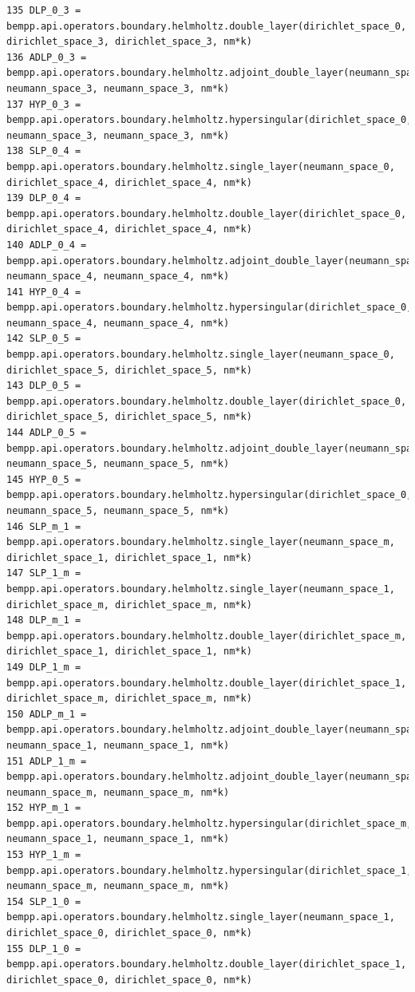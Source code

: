 \documentclass[12pt,letterpaper]{article}
\numberwithin{equation}{section}
\begin{document}
\begin{lstlisting}
135 DLP_0_3 = bempp.api.operators.boundary.helmholtz.double_layer(dirichlet_space_0, dirichlet_space_3, dirichlet_space_3, nm*k)
136 ADLP_0_3 = bempp.api.operators.boundary.helmholtz.adjoint_double_layer(neumann_space_0, neumann_space_3, neumann_space_3, nm*k)
137 HYP_0_3 = bempp.api.operators.boundary.helmholtz.hypersingular(dirichlet_space_0, neumann_space_3, neumann_space_3, nm*k)
138 SLP_0_4 = bempp.api.operators.boundary.helmholtz.single_layer(neumann_space_0, dirichlet_space_4, dirichlet_space_4, nm*k)
139 DLP_0_4 = bempp.api.operators.boundary.helmholtz.double_layer(dirichlet_space_0, dirichlet_space_4, dirichlet_space_4, nm*k)
140 ADLP_0_4 = bempp.api.operators.boundary.helmholtz.adjoint_double_layer(neumann_space_0, neumann_space_4, neumann_space_4, nm*k)
141 HYP_0_4 = bempp.api.operators.boundary.helmholtz.hypersingular(dirichlet_space_0, neumann_space_4, neumann_space_4, nm*k)
142 SLP_0_5 = bempp.api.operators.boundary.helmholtz.single_layer(neumann_space_0, dirichlet_space_5, dirichlet_space_5, nm*k)
143 DLP_0_5 = bempp.api.operators.boundary.helmholtz.double_layer(dirichlet_space_0, dirichlet_space_5, dirichlet_space_5, nm*k)
144 ADLP_0_5 = bempp.api.operators.boundary.helmholtz.adjoint_double_layer(neumann_space_0, neumann_space_5, neumann_space_5, nm*k)
145 HYP_0_5 = bempp.api.operators.boundary.helmholtz.hypersingular(dirichlet_space_0, neumann_space_5, neumann_space_5, nm*k)
146 SLP_m_1 = bempp.api.operators.boundary.helmholtz.single_layer(neumann_space_m, dirichlet_space_1, dirichlet_space_1, nm*k)
147 SLP_1_m = bempp.api.operators.boundary.helmholtz.single_layer(neumann_space_1, dirichlet_space_m, dirichlet_space_m, nm*k)
148 DLP_m_1 = bempp.api.operators.boundary.helmholtz.double_layer(dirichlet_space_m, dirichlet_space_1, dirichlet_space_1, nm*k)
149 DLP_1_m = bempp.api.operators.boundary.helmholtz.double_layer(dirichlet_space_1, dirichlet_space_m, dirichlet_space_m, nm*k)
150 ADLP_m_1 = bempp.api.operators.boundary.helmholtz.adjoint_double_layer(neumann_space_m, neumann_space_1, neumann_space_1, nm*k)
151 ADLP_1_m = bempp.api.operators.boundary.helmholtz.adjoint_double_layer(neumann_space_1, neumann_space_m, neumann_space_m, nm*k)
152 HYP_m_1 = bempp.api.operators.boundary.helmholtz.hypersingular(dirichlet_space_m, neumann_space_1, neumann_space_1, nm*k)
153 HYP_1_m = bempp.api.operators.boundary.helmholtz.hypersingular(dirichlet_space_1, neumann_space_m, neumann_space_m, nm*k)
154 SLP_1_0 = bempp.api.operators.boundary.helmholtz.single_layer(neumann_space_1, dirichlet_space_0, dirichlet_space_0, nm*k)
155 DLP_1_0 = bempp.api.operators.boundary.helmholtz.double_layer(dirichlet_space_1, dirichlet_space_0, dirichlet_space_0, nm*k)

\end{lstlisting}
\end{document}
